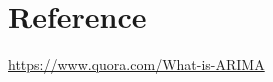 \documentclass[11pt]{article}
\begin{document}
\section{Reference}\label{reference}

\url{https://www.quora.com/What-is-ARIMA}


    
    
    
    
\end{document}
